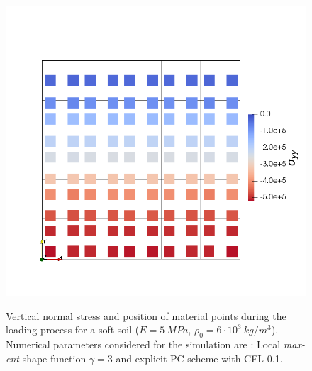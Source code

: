 \begin{figure}
{    \includegraphics[width=0.8\columnwidth]{Figures/Block_LME3_PCE_c_t1}
    \label{fig:Block-LME3-PCE-t1}
  }
  \caption{Vertical normal stress and position of material points
    during the loading process for a soft soil ($E = 5\ MPa$, $\rho_0
    = 6\cdot 10^3\ kg/m^3$). Numerical parameters considered for the
    simulation are : Local \textit{max-ent} shape function $\gamma =3$
    and explicit PC scheme with CFL 0.1.}
  \label{fig:Block-LME3}
\end{figure}







